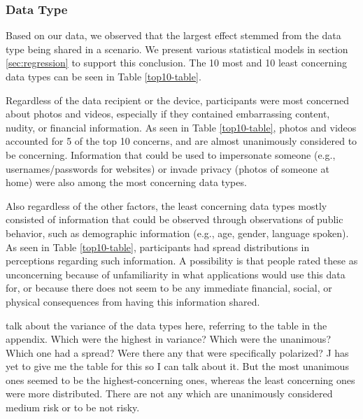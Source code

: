 
\subsubsection{Data Type}
Based on our data, we observed that the largest effect stemmed from the data type being shared in a scenario. We present various statistical models in section \ref{sec:regression} to support this conclusion. The 10 most and 10 least concerning data types can be seen in Table \ref{top10-table}. 

Regardless of the data recipient or the device, participants were most concerned about photos and videos, especially if they contained embarrassing content, nudity, or financial information. As seen in Table \ref{top10-table}, photos and videos accounted for 5 of the top 10 concerns, and are almost unanimously considered to be concerning. Information that could be used to impersonate someone (e.g., usernames/passwords for websites) or invade privacy (photos of someone at home) were also among the most concerning data types. 

Also regardless of the other factors, the least concerning data types mostly consisted of information that could be observed through observations of public behavior, such as demographic information (e.g., age, gender, language spoken). As seen in Table \ref{top10-table}, participants had spread distributions in perceptions regarding such information.  A possibility is that people rated these as unconcerning because of unfamiliarity in what applications would use this data for, or because there does not seem to be any immediate financial, social, or physical consequences from having this information shared.

{\color {red} talk about the variance of the data types here, referring to the table in the appendix. Which were the highest in variance? Which were the unanimous? Which one had a spread? Were there any that were specifically polarized? J has yet to give me the table for this so I can talk about it. But the most unanimous ones seemed to be the highest-concerning ones, whereas the least concerning ones were more distributed. There are not any which are unanimously considered medium risk or to be not risky.}

